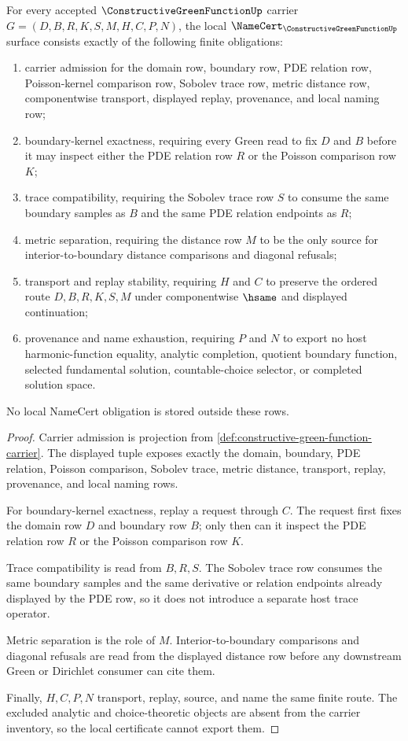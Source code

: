 \begin{theorem}
\label{thm:constructive-green-function-namecert-obligations}
For every accepted $\ConstructiveGreenFunctionUp$ carrier $G=(D,B,R,K,S,M,H,C,P,N)$, the local $\NameCert_{\ConstructiveGreenFunctionUp}$ surface consists exactly of the following finite obligations:
\begin{enumerate}
\item carrier admission for the domain row, boundary row, PDE relation row, Poisson-kernel comparison row, Sobolev trace row, metric distance row, componentwise transport, displayed replay, provenance, and local naming row;
\item boundary-kernel exactness, requiring every Green read to fix $D$ and $B$ before it may inspect either the PDE relation row $R$ or the Poisson comparison row $K$;
\item trace compatibility, requiring the Sobolev trace row $S$ to consume the same boundary samples as $B$ and the same PDE relation endpoints as $R$;
\item metric separation, requiring the distance row $M$ to be the only source for interior-to-boundary distance comparisons and diagonal refusals;
\item transport and replay stability, requiring $H$ and $C$ to preserve the ordered route $D,B,R,K,S,M$ under componentwise $\hsame$ and displayed continuation;
\item provenance and name exhaustion, requiring $P$ and $N$ to export no host harmonic-function equality, analytic completion, quotient boundary function, selected fundamental solution, countable-choice selector, or completed solution space.
\end{enumerate}
No local NameCert obligation is stored outside these rows.
\end{theorem}
\begin{proof}
Carrier admission is projection from \autoref{def:constructive-green-function-carrier}. The displayed tuple exposes exactly the domain, boundary, PDE relation, Poisson comparison, Sobolev trace, metric distance, transport, replay, provenance, and local naming rows.

For boundary-kernel exactness, replay a request through $C$. The request first fixes the domain row $D$ and boundary row $B$; only then can it inspect the PDE relation row $R$ or the Poisson comparison row $K$.

Trace compatibility is read from $B,R,S$. The Sobolev trace row consumes the same boundary samples and the same derivative or relation endpoints already displayed by the PDE row, so it does not introduce a separate host trace operator.

Metric separation is the role of $M$. Interior-to-boundary comparisons and diagonal refusals are read from the displayed distance row before any downstream Green or Dirichlet consumer can cite them.

Finally, $H,C,P,N$ transport, replay, source, and name the same finite route. The excluded analytic and choice-theoretic objects are absent from the carrier inventory, so the local certificate cannot export them.
\end{proof}


